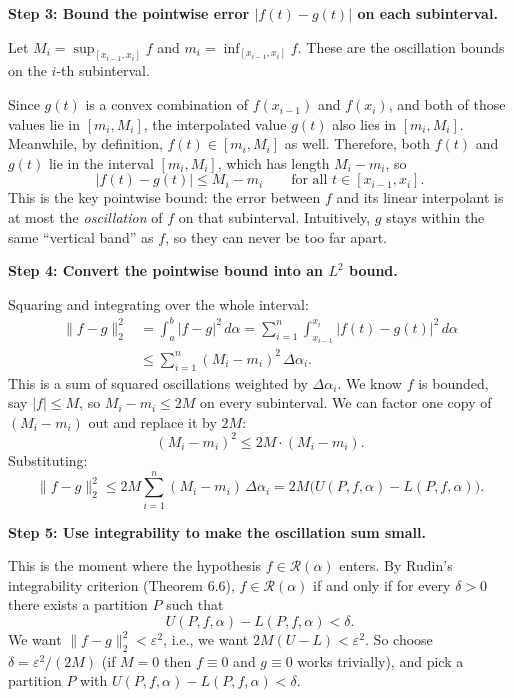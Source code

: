 \documentclass[10pt]{article}
\begin{document}
\medskip
\textbf{Step 3: Bound the pointwise error $|f(t) - g(t)|$ on each subinterval.}

Let $M_i = \sup_{[x_{i-1}, x_i]} f$ and $m_i = \inf_{[x_{i-1}, x_i]} f$.
These are the oscillation bounds on the $i$-th subinterval.

Since $g(t)$ is a convex combination of $f(x_{i-1})$ and $f(x_i)$, and both of those values lie in $[m_i, M_i]$, the interpolated value $g(t)$ also lies in $[m_i, M_i]$.
Meanwhile, by definition, $f(t) \in [m_i, M_i]$ as well.
Therefore, both $f(t)$ and $g(t)$ lie in the interval $[m_i, M_i]$, which has length $M_i - m_i$, so
$$|f(t) - g(t)| \leq M_i - m_i \qquad \text{for all } t \in [x_{i-1}, x_i].$$
This is the key pointwise bound: the error between $f$ and its linear interpolant is at most the \emph{oscillation} of $f$ on that subinterval.
Intuitively, $g$ stays within the same ``vertical band'' as $f$, so they can never be too far apart.

\medskip
\textbf{Step 4: Convert the pointwise bound into an $L^2$ bound.}

Squaring and integrating over the whole interval:
\begin{align*}
\|f - g\|_2^2
  &= \int_a^b |f - g|^2 \, d\alpha
   = \sum_{i=1}^n \int_{x_{i-1}}^{x_i} |f(t) - g(t)|^2 \, d\alpha \\
  &\leq \sum_{i=1}^n (M_i - m_i)^2 \, \Delta\alpha_i.
\end{align*}
This is a sum of squared oscillations weighted by $\Delta\alpha_i$.
We know $f$ is bounded, say $|f| \leq M$, so $M_i - m_i \leq 2M$ on every subinterval.
We can factor one copy of $(M_i - m_i)$ out and replace it by $2M$:
$$(M_i - m_i)^2 \leq 2M \cdot (M_i - m_i).$$
Substituting:
$$\|f - g\|_2^2 \leq 2M \sum_{i=1}^n (M_i - m_i) \, \Delta\alpha_i = 2M \bigl(U(P, f, \alpha) - L(P, f, \alpha)\bigr).$$

\medskip
\textbf{Step 5: Use integrability to make the oscillation sum small.}

This is the moment where the hypothesis $f \in \mathscr{R}(\alpha)$ enters.
By Rudin's integrability criterion (Theorem 6.6), $f \in \mathscr{R}(\alpha)$ if and only if for every $\delta > 0$ there exists a partition $P$ such that
$$U(P, f, \alpha) - L(P, f, \alpha) < \delta.$$
We want $\|f - g\|_2^2 < \varepsilon^2$, i.e., we want $2M(U - L) < \varepsilon^2$.
So choose $\delta = \varepsilon^2 / (2M)$ (if $M = 0$ then $f \equiv 0$ and $g \equiv 0$ works trivially), and pick a partition $P$ with $U(P,f,\alpha) - L(P,f,\alpha) < \delta$.
\end{document}
